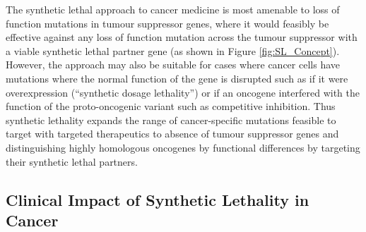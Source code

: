 The synthetic lethal approach to cancer medicine is most amenable to loss of function mutations in tumour suppressor genes, where it would feasibly be effective against any loss of function mutation across the tumour suppressor with a viable synthetic lethal partner gene (as shown in Figure \ref{fig:SL_Concept}). However, the approach may also be suitable for cases where cancer cells have mutations where the normal function of the gene is disrupted such as if it were overexpression (``synthetic dosage lethality'') or if an oncogene interfered with the function of the proto-oncogenic variant such as competitive inhibition. Thus synthetic lethality expands the range of cancer-specific mutations feasible to target with targeted therapeutics to absence of tumour suppressor genes and distinguishing highly homologous oncogenes by functional differences by targeting their synthetic lethal partners. 

\subsection{Clinical Impact of Synthetic Lethality in Cancer}



